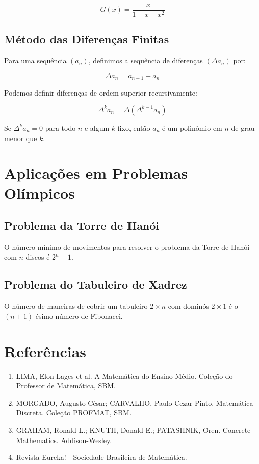 \documentclass[12pt,a4paper]{article}
\begin{document}
\begin{equation}
G(x) = \frac{x}{1-x-x^2}
\end{equation}

\subsection{Método das Diferenças Finitas}

Para uma sequência $(a_n)$, definimos a sequência de diferenças $(\Delta a_n)$ por:

\begin{equation}
\Delta a_n = a_{n+1} - a_n
\end{equation}

Podemos definir diferenças de ordem superior recursivamente:

\begin{equation}
\Delta^k a_n = \Delta(\Delta^{k-1} a_n)
\end{equation}

Se $\Delta^k a_n = 0$ para todo $n$ e algum $k$ fixo, então $a_n$ é um polinômio em $n$ de grau menor que $k$.

\section{Aplicações em Problemas Olímpicos}

\subsection{Problema da Torre de Hanói}

O número mínimo de movimentos para resolver o problema da Torre de Hanói com $n$ discos é $2^n - 1$.

\subsection{Problema do Tabuleiro de Xadrez}

O número de maneiras de cobrir um tabuleiro $2 \times n$ com dominós $2 \times 1$ é o $(n+1)$-ésimo número de Fibonacci.

\section{Referências}

\begin{enumerate}
    \item LIMA, Elon Lages et al. A Matemática do Ensino Médio. Coleção do Professor de Matemática, SBM.
    \item MORGADO, Augusto César; CARVALHO, Paulo Cezar Pinto. Matemática Discreta. Coleção PROFMAT, SBM.
    \item GRAHAM, Ronald L.; KNUTH, Donald E.; PATASHNIK, Oren. Concrete Mathematics. Addison-Wesley.
    \item Revista Eureka! - Sociedade Brasileira de Matemática.
\end{enumerate}
\end{document}
